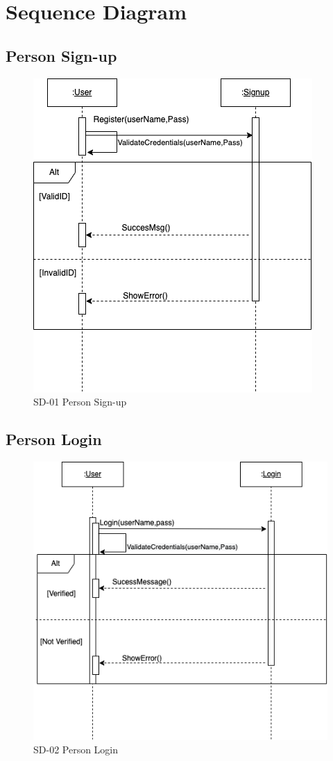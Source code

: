 \documentclass[12pt,a4paper]{article}
\begin{document}
\newpage
\section{Sequence Diagram}
\subsection{Person Sign-up}
\begin{figure}[h]
 \centering
\includegraphics[scale=0.80]{Diagram/Signup Sequence Diagram.png}
\caption{SD-01 Person Sign-up}
\end{figure}

\newpage
\subsection{Person Login}
\begin{figure}[h]
 \centering
\includegraphics[scale=0.80]{Diagram/Login Sequence Diagram_NEW.png}
\caption{SD-02 Person Login}
\end{figure}
\end{document}
